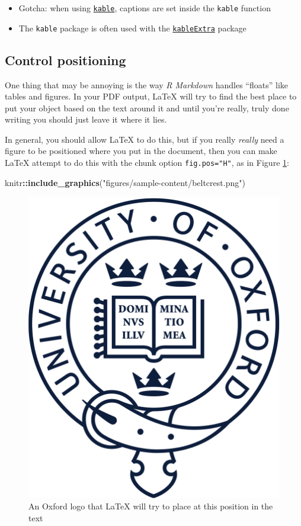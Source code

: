 \documentclass[a4paper,nobind]{templates/ociamthesis}
\providecommand{\tightlist}{%
  \setlength{\itemsep}{0pt}\setlength{\parskip}{0pt}}
\newenvironment{Shaded}{\begin{snugshade}}{\end{snugshade}}
\newcommand{\KeywordTok}[1]{\textcolor[rgb]{0.13,0.29,0.53}{\textbf{#1}}}
\newcommand{\NormalTok}[1]{#1}
\newcommand{\OperatorTok}[1]{\textcolor[rgb]{0.81,0.36,0.00}{\textbf{#1}}}
\newcommand{\StringTok}[1]{\textcolor[rgb]{0.31,0.60,0.02}{#1}}
\renewenvironment{Shaded}
{
  \vspace{10pt}%
  \begin{snugshade}%
}{%
  \end{snugshade}%
  \vspace{8pt}%
}
\begin{document}
\begin{itemize}
\tightlist
\item
  Gotcha: when using
  \href{https://www.rdocumentation.org/packages/knitr/versions/1.21/topics/kable}{\texttt{kable}},
  captions are set inside the \texttt{kable} function
\item
  The \texttt{kable} package is often used with the
  \href{https://cran.r-project.org/web/packages/kableExtra/vignettes/awesome_table_in_html.html}{\texttt{kableExtra}}
  package
\end{itemize}

\subsection{Control positioning}\label{control-positioning}

One thing that may be annoying is the way \emph{R Markdown} handles
``floats'' like tables and figures. In your PDF output, LaTeX will try
to find the best place to put your object based on the text around it
and until you're really, truly done writing you should just leave it
where it lies.

In general, you should allow LaTeX to do this, but if you really
\emph{really} need a figure to be positioned where you put in the
document, then you can make LaTeX attempt to do this with the chunk
option \texttt{fig.pos="H"}, as in Figure
\ref{fig:oxford-logo-controlled}:

\begin{Shaded}
\begin{Highlighting}[]
\NormalTok{knitr}\OperatorTok{::}\KeywordTok{include_graphics}\NormalTok{(}\StringTok{"figures/sample-content/beltcrest.png"}\NormalTok{)}
\end{Highlighting}
\end{Shaded}

\begin{figure}[H]

{\centering \includegraphics[width=0.5\linewidth]{figures/sample-content/beltcrest} 

}

\caption{An Oxford logo that LaTeX will try to place at this position in the text}\label{fig:oxford-logo-controlled}
\end{figure}
\end{document}
